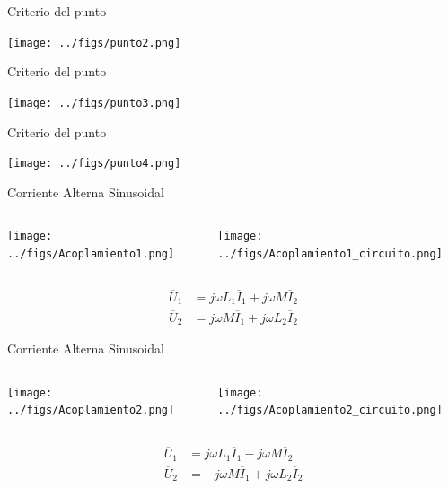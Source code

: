 \documentclass[xcolor={usenames,svgnames,dvipsnames}]{beamer}
\begin{document}
\begin{frame}[label={sec:org7c327e6}]{Criterio del punto}
\begin{center}
\texttt{[image: ../figs/punto2.png]}
\end{center}
\end{frame}

\begin{frame}[label={sec:org0cedcf0}]{Criterio del punto}
\begin{center}
\texttt{[image: ../figs/punto3.png]}
\end{center}
\end{frame}
\begin{frame}[label={sec:orgb489ea9}]{Criterio del punto}
\begin{center}
\texttt{[image: ../figs/punto4.png]}
\end{center}
\end{frame}
\begin{frame}[label={sec:org409ff05}]{Corriente Alterna Sinusoidal}
\begin{columns}
\begin{column}{0.5\columnwidth}
\begin{center}
\texttt{[image: ../figs/Acoplamiento1.png]}
\end{center}
\end{column}

\begin{column}{0.5\columnwidth}
\begin{center}
\texttt{[image: ../figs/Acoplamiento1\_circuito.png]}
\end{center}
\end{column}
\end{columns}
\begin{align*}
  \overline{U}_1 &= j \omega L_1 \overline{I}_1 + j \omega M \overline{I}_2\\
  \overline{U}_2 &= j \omega M \overline{I}_1 + j \omega L_2 \overline{I}_2
\end{align*}
\end{frame}
\begin{frame}[label={sec:org81fd55d}]{Corriente Alterna Sinusoidal}
\begin{columns}
\begin{column}{0.5\columnwidth}
\begin{center}
\texttt{[image: ../figs/Acoplamiento2.png]}
\end{center}
\end{column}

\begin{column}{0.5\columnwidth}
\begin{center}
\texttt{[image: ../figs/Acoplamiento2\_circuito.png]}
\end{center}
\end{column}
\end{columns}
\begin{align*}
  \overline{U}_1 &= j \omega L_1 \overline{I}_1 - j \omega M \overline{I}_2\\
  \overline{U}_2 &= - j \omega M \overline{I}_1 + j \omega L_2 \overline{I}_2
\end{align*}
\end{frame}
\end{document}
